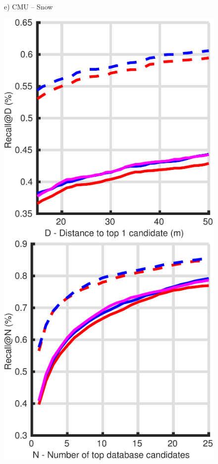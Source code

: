 \begin{figure}
\begin{minipage}{0.27\linewidth}
		e) CMU -- Snow
	\end{minipage}\hfill
	\begin{minipage}{0.27\linewidth}
		\center \scriptsize
		\includegraphics[width=\linewidth]{plot/oxf_cmu/Results_cmu_autumn/distance}	
		
		\includegraphics[width=\linewidth]{plot/oxf_cmu/Results_cmu_autumn/recall}
		

\end{minipage}
\end{figure}
